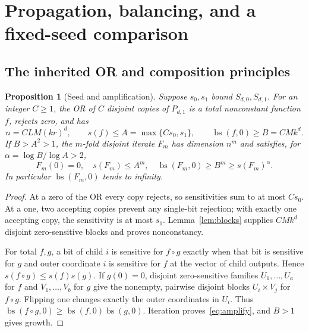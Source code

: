 \documentclass[11pt]{amsart}
\newtheorem{proposition}[theorem]{Proposition}
\theoremstyle{definition}
\theoremstyle{remark}
\newcommand{\bs}{\operatorname{bs}}
\begin{document}
\section{Propagation, balancing, and a fixed-seed comparison}
\subsection{The inherited OR and composition principles}

\begin{proposition}[Seed and amplification]\label{prop:seed}
Suppose $s_0,s_1$ bound $S_{d,0},S_{d,1}$. For an integer $C\ge1$,
the OR of $C$ disjoint copies of $P_{d,1}$ is a total nonconstant
function $f$, rejects zero, and has
\begin{equation}\label{eq:seed}
 n=CLM(kr)^d,\qquad s(f)\le A=\max\{Cs_0,s_1\},\qquad
 \bs(f,0)\ge B=CMk^d.
\end{equation}
If $B>A^2>1$, the $m$-fold disjoint iterate $F_m$ has dimension $n^m$
and satisfies, for $\alpha=\log B/\log A>2$,
\begin{equation}\label{eq:amplify}
 F_m(0)=0,\quad s(F_m)\le A^m,\quad
 \bs(F_m,0)\ge B^m\ge s(F_m)^\alpha.
\end{equation}
In particular $\bs(F_m,0)$ tends to infinity.
\end{proposition}
\begin{proof}
At a zero of the OR every copy rejects, so sensitivities sum to at
most $Cs_0$. At a one, two accepting copies prevent any single-bit
rejection; with exactly one accepting copy, the sensitivity is at
most $s_1$. Lemma~\ref{lem:blocks} supplies $CMk^d$ disjoint
zero-sensitive blocks and proves nonconstancy.

For total $f,g$, a bit of child $i$ is sensitive for $f\circ g$
exactly when that bit is sensitive for $g$ and outer coordinate $i$
is sensitive for $f$ at the vector of child outputs. Hence
$s(f\circ g)\le s(f)s(g)$. If $g(0)=0$, disjoint zero-sensitive
families $U_1,\ldots,U_a$ for $f$ and $V_1,\ldots,V_b$ for $g$
give the nonempty, pairwise disjoint blocks $U_i\times V_j$ for
$f\circ g$. Flipping one changes exactly the outer coordinates in
$U_i$. Thus $\bs(f\circ g,0)\ge\bs(f,0)\bs(g,0)$.
Iteration proves~\eqref{eq:amplify}, and $B>1$ gives growth.
\end{proof}
\end{document}
